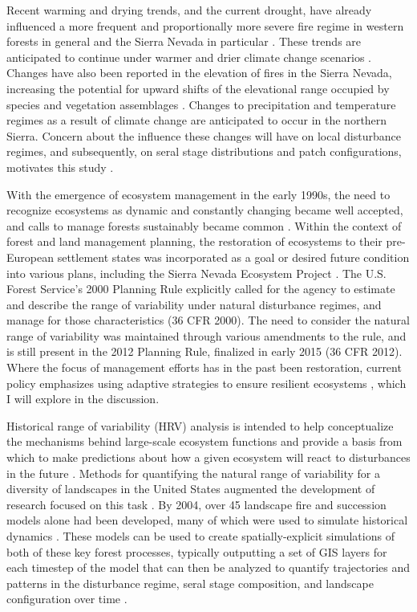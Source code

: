 Recent warming and drying trends, and the current drought, have already influenced a more frequent and proportionally more severe fire regime in western forests in general and the Sierra Nevada in particular \citep{McKenzie2004,Westerling2011,Miller2012}. These trends are anticipated to continue under warmer and drier climate change scenarios \citep{Dale2001,Westerling2008,Cook2004}. Changes have also been reported in the elevation of fires in the Sierra Nevada, increasing the potential for upward shifts of the elevational range occupied by species and vegetation assemblages \citep{Schwartz2015}. Changes to precipitation and temperature regimes as a result of climate change are anticipated to occur in the northern Sierra. Concern about the influence these changes will have on local disturbance regimes, and subsequently, on seral stage distributions and patch configurations, motivates this study \citep{Fule2008,North2012}.

With the emergence of ecosystem management in the early 1990s, the need to recognize ecosystems as dynamic and constantly changing became well accepted, and calls to manage forests sustainably became common \citep{Christensen1996}. Within the context of forest and land management planning, the restoration of ecosystems to their pre-European settlement states was incorporated as a goal or desired future condition into various plans, including the Sierra Nevada Ecosystem Project \citep{SNEP1996a}. The U.S. Forest Service's 2000 Planning Rule explicitly called for the agency to estimate and describe the range of variability under natural disturbance regimes, and manage for those characteristics (36 CFR  2000). The need to consider the natural range of variability was maintained through various amendments to the rule, and is still present in the 2012 Planning Rule, finalized in early 2015 (36 CFR  2012). Where the focus of management efforts has in the past been restoration, current policy emphasizes using adaptive strategies to ensure resilient ecosystems \citep{Stephens2010}, which I will explore in the discussion.

Historical range of variability (HRV) analysis is intended to help conceptualize the mechanisms behind large-scale ecosystem functions and provide a basis from which to make predictions about how a given ecosystem will react to disturbances in the future \citep{Nonaka2005,Landres1999}. Methods for quantifying the natural range of variability for a diversity of landscapes in the United States augmented the development of research focused on this task \citep{Landres1999}. By 2004, over 45 landscape fire and succession models alone had been developed, many of which were used to simulate historical dynamics \citep{Keane2004}. These models can be used to create spatially-explicit simulations of both of these key forest processes, typically outputting a set of GIS layers for each timestep of the model that can then be analyzed to quantify trajectories and patterns in the disturbance regime, seral stage composition, and landscape configuration over time \citep{Keane2004}. 

